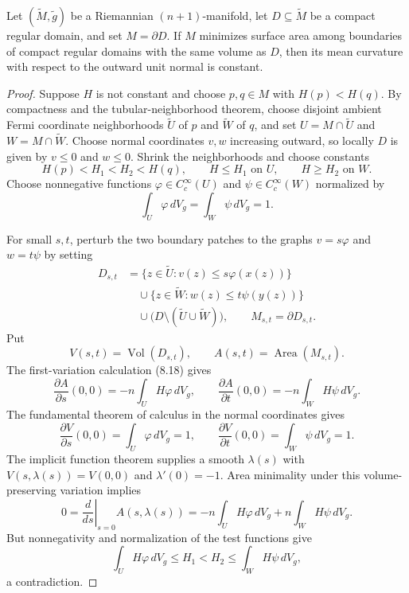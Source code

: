 \begin{theorem}
\label{thm:constant-mean-curvature-isoperimetric}
Let $(\widetilde M,\widetilde g)$ be a Riemannian $(n+1)$-manifold, let
$D\subseteq\widetilde M$ be a compact regular domain, and set $M=\partial D$.
If $M$ minimizes surface area among boundaries of compact regular domains with
the same volume as $D$, then its mean curvature with respect to the outward
unit normal is constant.
\end{theorem}

\begin{proof}
\sketch Suppose $H$ is not constant and choose $p,q\in M$ with
$H(p)<H(q)$. By compactness and the tubular-neighborhood theorem, choose
disjoint ambient Fermi coordinate neighborhoods $\widetilde U$ of $p$ and
$\widetilde W$ of $q$, and set
$U=M\cap\widetilde U$ and $W=M\cap\widetilde W$. Choose normal coordinates
$v,w$ increasing outward, so locally $D$ is given by $v\leq0$ and $w\leq0$.
Shrink the neighborhoods and choose constants
\[
H(p)<H_1<H_2<H(q),
\qquad H\leq H_1\text{ on }U,
\qquad H\geq H_2\text{ on }W.
\]
Choose nonnegative functions
$\varphi\in C_c^\infty(U)$ and $\psi\in C_c^\infty(W)$ normalized by
\[
\int_U\varphi\,dV_g=\int_W\psi\,dV_g=1.
\]

For small $s,t$, perturb the two boundary patches to the graphs
$v=s\varphi$ and $w=t\psi$ by setting
\begin{align*}
D_{s,t}
&=\{z\in\widetilde U:v(z)\leq s\varphi(x(z))\}\\
&\quad\cup\{z\in\widetilde W:w(z)\leq t\psi(y(z))\}\\
&\quad\cup\bigl(D\setminus(\widetilde U\cup\widetilde W)\bigr),
\qquad M_{s,t}=\partial D_{s,t}.
\end{align*}
Put
\[
V(s,t)=\operatorname{Vol}(D_{s,t}),
\qquad A(s,t)=\operatorname{Area}(M_{s,t}).
\]
The first-variation calculation (8.18) gives
\[
\frac{\partial A}{\partial s}(0,0)
=-n\int_UH\varphi\,dV_g,
\qquad
\frac{\partial A}{\partial t}(0,0)
=-n\int_WH\psi\,dV_g.
\]
The fundamental theorem of calculus in the normal coordinates gives
\[
\frac{\partial V}{\partial s}(0,0)
=\int_U\varphi\,dV_g=1,
\qquad
\frac{\partial V}{\partial t}(0,0)
=\int_W\psi\,dV_g=1.
\]
The implicit function theorem supplies a smooth $\lambda(s)$ with
$V(s,\lambda(s))=V(0,0)$ and $\lambda'(0)=-1$. Area minimality under this
volume-preserving variation implies
\[
0=\left.\frac d{ds}\right|_{s=0}A(s,\lambda(s))
=-n\int_UH\varphi\,dV_g+n\int_WH\psi\,dV_g.
\]
But nonnegativity and normalization of the test functions give
\[
\int_UH\varphi\,dV_g
\leq H_1<H_2
\leq\int_WH\psi\,dV_g,
\]
a contradiction.
\end{proof}


